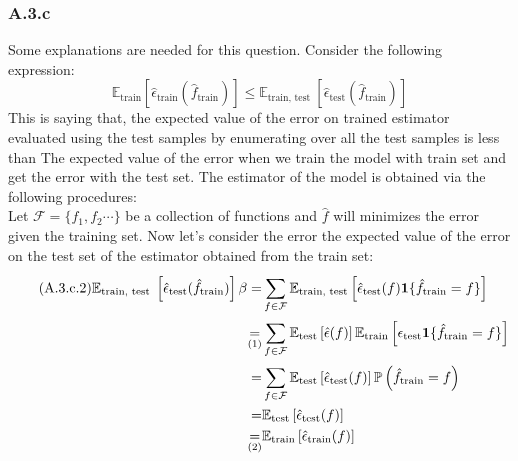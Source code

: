 \documentclass[]{article}
\begin{document}
    \subsubsection*{A.3.c}
        Some explanations are needed for this question. Consider the following expression: 
        \begin{equation*}\tag{A.3.c.1}\label{eqn:A.3.c.1}
            \mathbb{E}_\text{train} 
            \left[\hat{\epsilon}_\text{train}(\hat{f}_\text{train})\right]
            \le
            \mathbb{E}_{\text{train, test }}\left[
                \hat{\epsilon}_\text{test}
                (\hat{f}_\text{train})
            \right]
        \end{equation*}
        This is saying that, the expected value of the error on trained estimator evaluated using the test samples by enumerating over all the test samples is less than The expected value of the error when we train the model with train set and get the error with the test set. 
        The estimator of the model is obtained via the following procedures: 
        \\[1em]
        Let $\mathcal{F} = \{f_1, f_2\cdots\}$ be a collection of functions and $\hat{f}$ will minimizes the error given the training set. Now let's consider the error the expected value of the error on the test set of the estimator obtained from the train set: 
        \begin{align*}\tag{A.3.c.2}\label{eqn:A.3.c.2}
            \mathbb{E}_{\text{train, test }}\left[
                \hat{\epsilon}_\text{test}
                (\hat{f}_\text{train})
            \right]\beta
            = &
            \sum_{f\in\mathcal{F}}^{}\mathbb{E}_\text{train, test}
            \left[
                \hat{\epsilon}_{\text{\text{test}}}(f)\mathbf{1}\{\hat{f}_\text{train} = f\}
            \right]
            \\
            \underset{\text{(1)}}{=} &
            \sum_{f\in\mathcal{F}}^{}
            \mathbb{E}_\text{test}\left[
                \hat{\epsilon}(f)
            \right]
            \mathbb{E}_\text{train}\left[\epsilon_\text{test}
                \mathbf{1}\{\hat{f}_\text{train} = f\}
            \right]
            \\
            = &
            \sum_{f\in\mathcal{F}}^{}
            \mathbb{E}_\text{test}\left[
                \hat{\epsilon}_\text{test}(f)
            \right]
            \mathbb{P}\left(
                \hat{f}_\text{train} = f
            \right)
            \\
            = &
            \mathbb{E}_\text{test}\left[
                \hat{\epsilon}_\text{test}(f)
            \right]
            \\
            \underset{\text{(2)}}{=}&
            \mathbb{E}_\text{train}\left[
                \hat{\epsilon}_\text{train}(f)
            \right]
        \end{align*}
\end{document}

